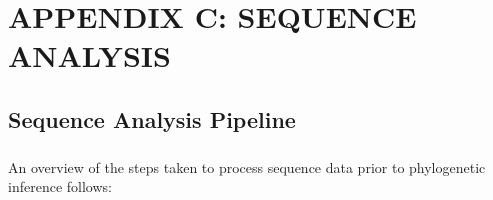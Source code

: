 {}
\chapter*{APPENDIX C: SEQUENCE ANALYSIS}

\section{Sequence Analysis Pipeline}

\paragraph{} An overview of the steps taken to process sequence data prior to phylogenetic inference follows:

\newenvironment{seqlist}
{\begin{enumerate}
    \setlength{\itemsep}{0pt}
    \setlength{\parskip}{0pt}
    \setlength{\parsep}{0pt} }
{\end{enumerate} } 

